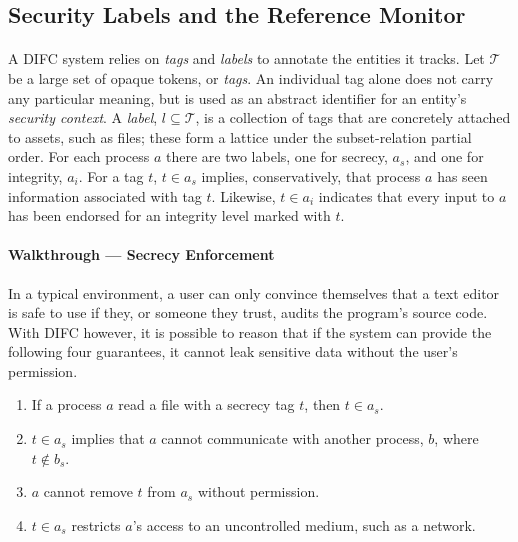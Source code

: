 \subsection{Security Labels and the Reference Monitor}

\paragraph{} A DIFC system relies on \textit{tags} and \textit{labels} to annotate the entities it tracks. Let $\mathcal{T}$ be a large set of opaque tokens, or \textit{tags}. An individual tag alone does not carry any particular meaning, but is used as an abstract identifier for an entity's \textit{security context}. A \textit{label}, $l \subseteq \mathcal{T}$, is a collection of tags that are concretely attached to assets, such as files; these form a lattice under the subset-relation partial order. For each process $a$ there are two labels, one for secrecy, $a_s$, and one for integrity, $a_i$. For a tag $t$, $t \in a_s$ implies, conservatively, that process $a$ has seen information associated with tag $t$. Likewise, $t \in a_i$ indicates that every input to $a$ has been endorsed for an integrity level marked with $t$.

\paragraph{Walkthrough --- Secrecy Enforcement} In a typical environment, a user can only convince themselves that a text editor is safe to use if they, or someone they trust, audits the program's source code. With DIFC however, it is possible to reason that if the system can provide the following four guarantees, it cannot leak sensitive data without the user's permission.

\begin{enumerate}
    \item If a process $a$ read a file with a secrecy tag $t$, then $t \in a_s$.
    \item $t \in a_s$ implies that $a$ cannot communicate with another process, $b$, where $t \notin b_s$.
    \item $a$ cannot remove $t$ from $a_s$ without permission.
    \item $t \in a_s$ restricts $a$'s access to an uncontrolled medium, such as a network.
\end{enumerate}

